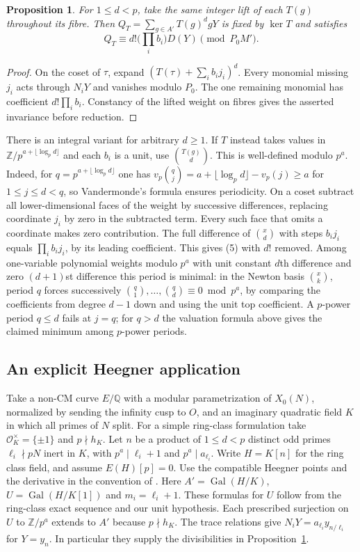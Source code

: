 \documentclass[11pt]{article}
\newtheorem{proposition}[theorem]{Proposition}
\newcommand{\Z}{\mathbb Z}
\newcommand{\Q}{\mathbb Q}
\newcommand{\Gal}{\operatorname{Gal}}
\begin{document}
\begin{proposition}\label{prop:compress}
For $1\le d<p$, take the same integer lift of each $T(g)$ throughout
its fibre. Then $Q_T=\sum_{g\in A'}T(g)^d gY$ is fixed by $\ker T$
and satisfies
\[
 Q_T\equiv d!\Big(\prod_i b_i\Big) D(Y)\pmod{P_0M'} .
 \tag{5}
\]
\end{proposition}
\begin{proof}
On the coset of $\tau$, expand $(T(\tau)+\sum_i b_i j_i)^d$.
Every monomial missing $j_i$ acts through $N_iY$ and vanishes
modulo $P_0$. The one remaining monomial has coefficient
$d!\prod_i b_i$. Constancy of the lifted weight on fibres gives
the asserted invariance before reduction.
\end{proof}

There is an integral variant for arbitrary $d\ge1$. If $T$ instead
takes values in $\Z/p^{a+\lfloor\log_p d\rfloor}$ and each $b_i$
is a unit, use $\binom{T(g)}d$. This is well-defined modulo $p^a$.
Indeed, for $q=p^{a+\lfloor\log_p d\rfloor}$ one has
$v_p\binom qj=a+\lfloor\log_p d\rfloor-v_p(j)\ge a$ for
$1\le j\le d<q$, so Vandermonde's formula ensures periodicity.
On a coset subtract all lower-dimensional faces of the weight by
successive differences, replacing coordinate $j_i$ by zero in the
subtracted term. Every such face that omits a coordinate makes zero
contribution. The full difference of $\binom{x}d$ with steps
$b_i j_i$ equals $\prod_i b_i j_i$, by its leading coefficient.
This gives (5) with $d!$ removed. Among one-variable polynomial
weights modulo $p^a$ with unit constant $d$th difference and
zero $(d+1)$st difference this period is minimal: in the Newton
basis $\binom{x}{k}$, period $q$ forces successively
$\binom q1,\dots,\binom qd\equiv0\bmod p^a$, by comparing the
coefficients from degree $d-1$ down and using the unit top
coefficient. A $p$-power period $q\le d$ fails at $j=q$; for
$q>d$ the valuation formula above gives the claimed minimum
among $p$-power periods.

\subsection*{An explicit Heegner application}
Take a non-CM curve $E/\Q$ with a modular parametrization of
$X_0(N)$, normalized by sending the infinity cusp to $O$, and an imaginary quadratic field $K$ in which all primes
of $N$ split. For a simple ring-class formulation take
$\mathcal O_K^\times=\{\pm1\}$ and $p\nmid h_K$. Let $n$ be a
product of $1\le d<p$ distinct odd primes $\ell_i\nmid pN$
inert in $K$, with $p^a\mid\ell_i+1$ and $p^a\mid a_{\ell_i}$.
Write $H=K[n]$ for the ring class field, and assume $E(H)[p]=0$.
Use the compatible Heegner points and the derivative in the convention
of \cite[\S3]{JLS}. Here $A'=\Gal(H/K)$, $U=\Gal(H/K[1])$
and $m_i=\ell_i+1$. These formulas for $U$ follow from the
ring-class exact sequence and our unit hypothesis. Each prescribed
surjection on $U$ to $\Z/p^a$ extends to $A'$ because $p\nmid h_K$.
The trace relations give $N_iY=a_{\ell_i}y_{n/\ell_i}$ for $Y=y_n$.
In particular they supply the divisibilities in
Proposition~\ref{prop:compress}.
\end{document}
